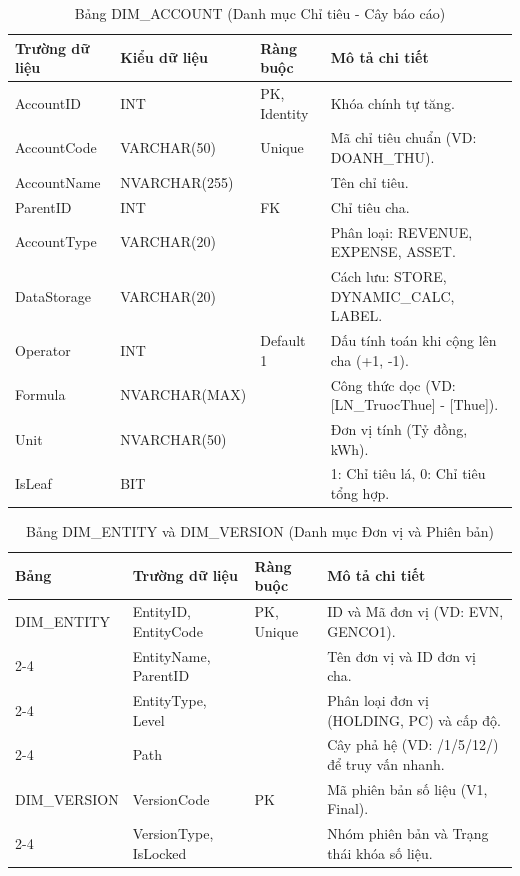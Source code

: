 \documentclass[12pt,a4paper]{article}
\begin{document}
\begin{table}[h!]
    \centering
    \caption{Bảng DIM\_ACCOUNT (Danh mục Chỉ tiêu - Cây báo cáo)}
    \begin{tabularx}{\textwidth}{|l|l|l|X|}
        \hline
        \textbf{Trường dữ liệu} & \textbf{Kiểu dữ liệu} & \textbf{Ràng buộc} & \textbf{Mô tả chi tiết} \\ \hline
        AccountID & INT & PK, Identity & Khóa chính tự tăng. \\ \hline
        AccountCode & VARCHAR(50) & Unique & Mã chỉ tiêu chuẩn (VD: DOANH\_THU). \\ \hline
        AccountName & NVARCHAR(255) & & Tên chỉ tiêu. \\ \hline
        ParentID & INT & FK & Chỉ tiêu cha. \\ \hline
        AccountType & VARCHAR(20) & & Phân loại: REVENUE, EXPENSE, ASSET. \\ \hline
        DataStorage & VARCHAR(20) & & Cách lưu: STORE, DYNAMIC\_CALC, LABEL. \\ \hline
        Operator & INT & Default 1 & Dấu tính toán khi cộng lên cha (+1, -1). \\ \hline
        Formula & NVARCHAR(MAX) & & Công thức dọc (VD: [LN\_TruocThue] - [Thue]). \\ \hline
        Unit & NVARCHAR(50) & & Đơn vị tính (Tỷ đồng, kWh). \\ \hline
        IsLeaf & BIT & & 1: Chỉ tiêu lá, 0: Chỉ tiêu tổng hợp. \\ \hline
    \end{tabularx}
\end{table}

\begin{table}[h!]
    \centering
    \caption{Bảng DIM\_ENTITY và DIM\_VERSION (Danh mục Đơn vị và Phiên bản)}
    \begin{tabularx}{\textwidth}{|l|l|l|X|}
        \hline
        \textbf{Bảng} & \textbf{Trường dữ liệu} & \textbf{Ràng buộc} & \textbf{Mô tả chi tiết} \\ \hline
        DIM\_ENTITY & EntityID, EntityCode & PK, Unique & ID và Mã đơn vị (VD: EVN, GENCO1). \\ \cline{2-4}
                    & EntityName, ParentID & & Tên đơn vị và ID đơn vị cha. \\ \cline{2-4}
                    & EntityType, Level & & Phân loại đơn vị (HOLDING, PC) và cấp độ. \\ \cline{2-4}
                    & Path & & Cây phả hệ (VD: /1/5/12/) để truy vấn nhanh. \\ \hline
        DIM\_VERSION& VersionCode & PK & Mã phiên bản số liệu (V1, Final). \\ \cline{2-4}
                    & VersionType, IsLocked& & Nhóm phiên bản và Trạng thái khóa số liệu. \\ \hline
    \end{tabularx}
\end{table}
\end{document}
